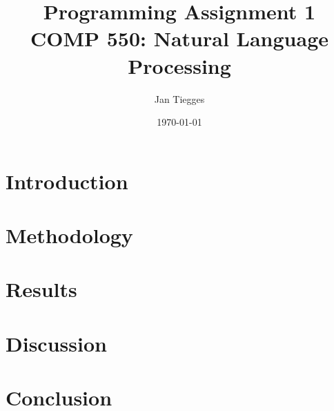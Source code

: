 \documentclass[12pt]{article}
\title{%
  \textbf{Programming Assignment 1}\\
  \vspace*{0.5em}
  \large COMP 550: Natural Language Processing}
\date{\today}
\author{Jan Tiegges}
\begin{document}
\maketitle

\section{Introduction}

\section{Methodology}

\section{Results}

\section{Discussion}

\section{Conclusion}



\end{document}

